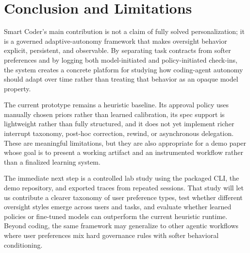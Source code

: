 \section{Conclusion and Limitations}

Smart Coder's main contribution is not a claim of fully solved personalization; it is a governed adaptive-autonomy framework that makes oversight behavior explicit, persistent, and observable. By separating task contracts from softer preferences and by logging both model-initiated and policy-initiated check-ins, the system creates a concrete platform for studying how coding-agent autonomy should adapt over time rather than treating that behavior as an opaque model property.

The current prototype remains a heuristic baseline. Its approval policy uses manually chosen priors rather than learned calibration, its spec support is lightweight rather than fully structured, and it does not yet implement richer interrupt taxonomy, post-hoc correction, rewind, or asynchronous delegation. These are meaningful limitations, but they are also appropriate for a demo paper whose goal is to present a working artifact and an instrumented workflow rather than a finalized learning system.

The immediate next step is a controlled lab study using the packaged CLI, the demo repository, and exported traces from repeated sessions. That study will let us contribute a clearer taxonomy of user preference types, test whether different oversight styles emerge across users and tasks, and evaluate whether learned policies or fine-tuned models can outperform the current heuristic runtime. Beyond coding, the same framework may generalize to other agentic workflows where user preferences mix hard governance rules with softer behavioral conditioning.
